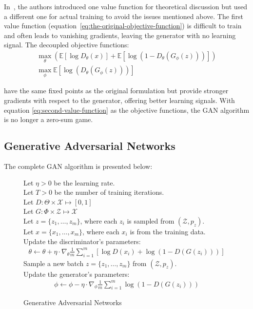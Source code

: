 In~\cite{ref:goodfellow-original}, the authors introduced one value function for theoretical discussion but used a different one for actual training to avoid the issues mentioned above. The first value function (equation~\ref{eq:the-original-objective-function}) is difficult to train and often leads to vanishing gradients, leaving the generator with no learning signal. The decoupled objective functions:
\begin{align}
	\label{eq:second-value-function}
	\max_{\theta} \left( \mathbb{E}\left[\log{D_\theta(x)}\right] + \mathbb{E}\left[\log(1 - D_\theta(G_\phi(z)))\right] \right) \\
	\max_{\phi}\mathbb{E}\left[\log(D_\theta(G_\phi(z)))\right]
\end{align}

have the same fixed points as the original formulation but provide stronger gradients with respect to the generator, offering better learning signals. With equation \ref{eq:second-value-function} as the objective functions, the GAN algorithm is no longer a zero-sum game.

\subsection{Generative Adversarial Networks}

The complete GAN algorithm is presented below:

\begin{figure}[H] \centering
	\begin{minipage}{0.95\linewidth}
		\begin{algorithm}[H]
			Let $\eta > 0$ be the learning rate. \\
			Let $T > 0$ be the number of training iterations. \\
			Let $D: \Theta \times \mathcal{X} \mapsto [0, 1]$ \\
			Let $G: \Phi \times \mathcal{Z} \mapsto \mathcal{X}$ \\
			 {
				Let $z = \{z_1, \dots, z_m\}$, where each $z_i$ is sampled from $(\mathcal{Z}, p_z)$. \\
				Let $x = \{x_1, \dots, x_m\}$, where each $x_i$ is from the training data. \\
				Update the discriminator's parameters:
				\begin{align*}
					\theta \gets \theta + \eta \cdot \nabla_{\theta} \frac{1}{m} \sum_{i=1}^m \left[ \log{D(x_i)} + \log{(1 - D(G(z_i)))} \right]
				\end{align*}
				Sample a new batch $z = \{z_1, \dots, z_m\}$ from $(\mathcal{Z}, p_z)$. \\
				Update the generator's parameters:
				\begin{align*}
					\phi \gets \phi - \eta \cdot \nabla_{\phi} \frac{1}{m} \sum_{i=1}^m \log{(1 - D(G(z_i)))}
				\end{align*}
			}
			\caption{Generative Adversarial Networks}
			\label{algo:main-algo}
		\end{algorithm}
	\end{minipage}
\end{figure}

